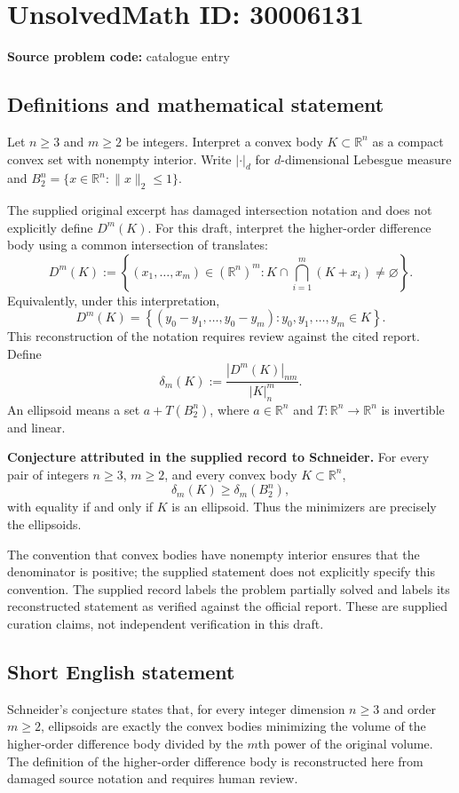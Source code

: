 \documentclass[11pt]{article}
\newcommand{\R}{\mathbb{R}}
\begin{document}
\section*{UnsolvedMath ID: 30006131}
\textbf{Source problem code:} catalogue entry
\subsection{Definitions and mathematical statement}
Let \(n\geq 3\) and \(m\geq 2\) be integers. Interpret a convex body \(K\subset\R^n\) as a compact convex set with nonempty interior. Write \(|\cdot|_d\) for \(d\)-dimensional Lebesgue measure and \(B_2^n=\{x\in\R^n:\|x\|_2\leq 1\}\).

The supplied original excerpt has damaged intersection notation and does not explicitly define \(D^m(K)\). For this draft, interpret the higher-order difference body using a common intersection of translates:
\[
D^m(K):=\left\{(x_1,\ldots,x_m)\in(\R^n)^m:
K\cap\bigcap_{i=1}^m(K+x_i)\neq\varnothing\right\}.
\]
Equivalently, under this interpretation,
\[
D^m(K)=\left\{(y_0-y_1,\ldots,y_0-y_m):y_0,y_1,\ldots,y_m\in K\right\}.
\]
This reconstruction of the notation requires review against the cited report. Define
\[
\delta_m(K):=\frac{|D^m(K)|_{nm}}{|K|_n^m}.
\]
An ellipsoid means a set \(a+T(B_2^n)\), where \(a\in\R^n\) and \(T:\R^n\to\R^n\) is invertible and linear.

\textbf{Conjecture attributed in the supplied record to Schneider.} For every pair of integers \(n\geq 3\), \(m\geq 2\), and every convex body \(K\subset\R^n\),
\[
\delta_m(K)\geq\delta_m(B_2^n),
\]
with equality if and only if \(K\) is an ellipsoid. Thus the minimizers are precisely the ellipsoids.

The convention that convex bodies have nonempty interior ensures that the denominator is positive; the supplied statement does not explicitly specify this convention. The supplied record labels the problem partially solved and labels its reconstructed statement as verified against the official report. These are supplied curation claims, not independent verification in this draft.
\subsection{Short English statement}
Schneider's conjecture states that, for every integer dimension \(n\geq3\) and order \(m\geq2\), ellipsoids are exactly the convex bodies minimizing the volume of the higher-order difference body divided by the \(m\)th power of the original volume. The definition of the higher-order difference body is reconstructed here from damaged source notation and requires human review.
\end{document}
